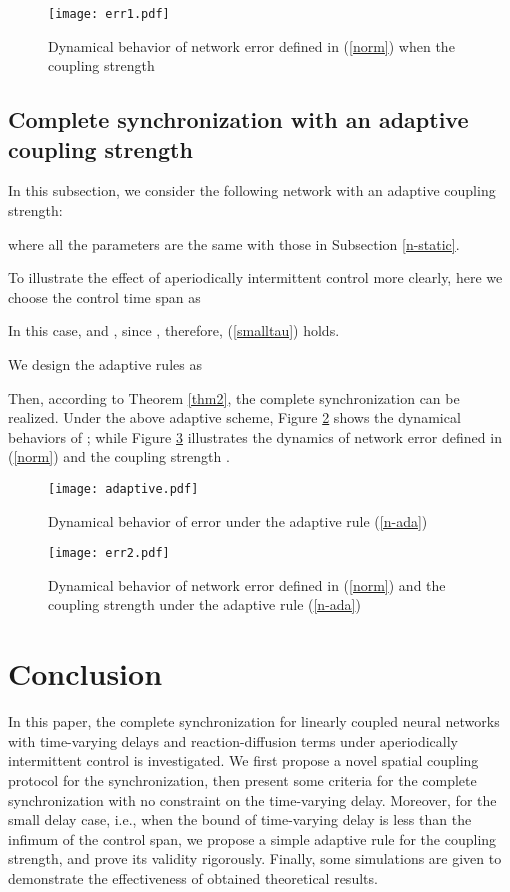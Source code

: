 \documentclass[review]{elsarticle}
\begin{document}
\begin{figure}
\begin{center}
\texttt{[image: err1.pdf]}
\end{center}
\caption{Dynamical behavior of network error  defined in (\ref{norm}) when the coupling strength }\label{wf5}
\end{figure}
\subsection{Complete synchronization with an adaptive coupling strength}
In this subsection, we consider the following network with an adaptive coupling strength:

where all the parameters are the same with those in Subsection \ref{n-static}.

To illustrate the effect of aperiodically intermittent control more clearly, here we choose the control time span as

In this case,  and , since , therefore, (\ref{smalltau}) holds.

We design the adaptive rules as

Then, according to Theorem \ref{thm2}, the complete synchronization can be realized. Under the above adaptive scheme, Figure \ref{wf6} shows the dynamical behaviors of ; while Figure \ref{wf7} illustrates the dynamics of network error  defined in (\ref{norm}) and the coupling strength .

\begin{figure}
\begin{center}
\texttt{[image: adaptive.pdf]}
\end{center}
\caption{Dynamical behavior of error  under the adaptive rule (\ref{n-ada})}\label{wf6}
\end{figure}

\begin{figure}
\begin{center}
\texttt{[image: err2.pdf]}
\end{center}
\caption{Dynamical behavior of network error  defined in (\ref{norm}) and the coupling strength  under the adaptive rule (\ref{n-ada})}\label{wf7}
\end{figure}

\section{Conclusion}\label{conclude}
In this paper, the complete synchronization for linearly coupled neural networks with time-varying delays and reaction-diffusion terms under aperiodically intermittent control is investigated. We first propose a novel spatial coupling protocol for the synchronization, then present some criteria for the complete synchronization with no constraint on the time-varying delay. Moreover, for the small delay case, i.e., when the bound of time-varying delay is less than the infimum of the control span, we propose a simple adaptive rule for the coupling strength, and prove its validity rigorously. Finally, some simulations are given to demonstrate the effectiveness of obtained theoretical results.
\end{document}

